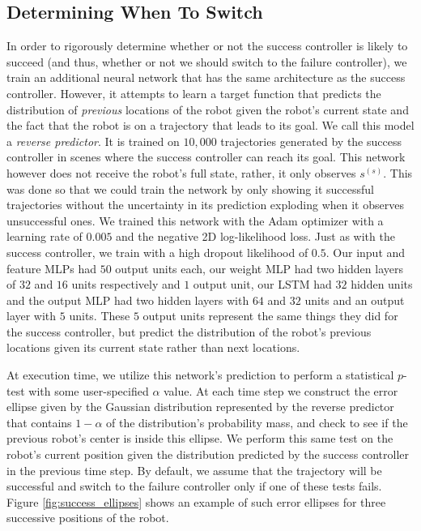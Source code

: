 \documentclass[letterpaper, 10 pt, conference]{ieeeconf}  %
\begin{document}
	\subsection{Determining When To Switch}
		In order to rigorously determine whether or not the success controller is likely to succeed (and thus, whether or not we should switch to the failure controller), we train an additional neural network that has the same architecture as the success controller. However, it attempts to learn a target function that predicts the distribution of \textit{previous} locations of the robot given the robot's current state and the fact that the robot is on a trajectory that leads to its goal. We call this model a \textit{reverse predictor}. It is trained on $10,000$ trajectories generated by the success controller in scenes where the success controller can reach its goal. This network however does not receive the robot's full state, rather, it only observes $s^{(s)}$. This was done so that we could train the network by only showing it successful trajectories without the uncertainty in its prediction exploding when it observes unsuccessful ones. We trained this network with the Adam optimizer with a learning rate of $0.005$ and the negative 2D log-likelihood loss. Just as with the success controller, we train with a high dropout likelihood of $0.5$. Our input and feature MLPs had $50$ output units each, our weight MLP had two hidden layers of $32$ and $16$ units respectively and $1$ output unit, our LSTM had $32$ hidden units and the output MLP had two hidden layers with $64$ and $32$ units and an output layer with $5$ units. These $5$ output units represent the same things they did for the success controller, but predict the distribution of the robot's previous locations given its current state rather than next locations.
		
		At execution time, we utilize this network's prediction to perform a statistical $p$-test with some user-specified $\alpha$ value. At each time step we construct the error ellipse given by the Gaussian distribution represented by the reverse predictor that contains $1-\alpha$ of the distribution's probability mass, and check to see if the previous robot's center is inside this ellipse. We perform this same test on the robot's current position given the distribution predicted by the success controller in the previous time step. By default, we assume that the trajectory will be successful and switch to the failure controller only if one of these tests fails. Figure \ref{fig:success_ellipses} shows an example of such error ellipses for three successive positions of the robot.
		
\end{document}
